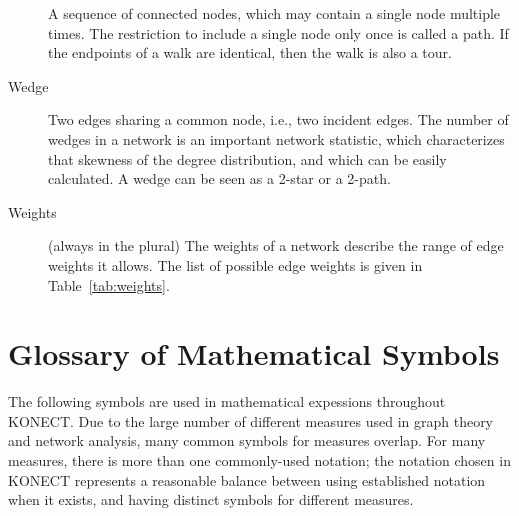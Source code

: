 \documentclass{article}
\begin{document}
\begin{description}
    A sequence of connected nodes, which may contain a single node
    multiple times.  The restriction to include a single node only once
    is called a path.  If the endpoints of a walk are identical, then
    the walk is also a tour.  
  \item[Wedge] 
    Two edges sharing a common node, i.e., two incident edges.  The
    number of wedges in a network is an important network statistic,
    which characterizes that skewness of the degree distribution, and
    which can be easily calculated.  A wedge can be seen as a 2-star or
    a 2-path.  
  \item[Weights] (always in the plural)
    The weights of a network describe the range of edge weights it
    allows.  The list of possible edge weights is given in
    Table~\ref{tab:weights}.  
\end{description}

\section{Glossary of Mathematical Symbols}

The following symbols are used in mathematical expessions throughout
KONECT.  Due to the large number of different measures used in graph
theory and network analysis, many common symbols for measures overlap.
For many measures, there is more than one commonly-used notation; the
notation chosen in KONECT represents a reasonable balance between using established
notation when it exists, and having distinct symbols for different
measures. \\
\end{document}

